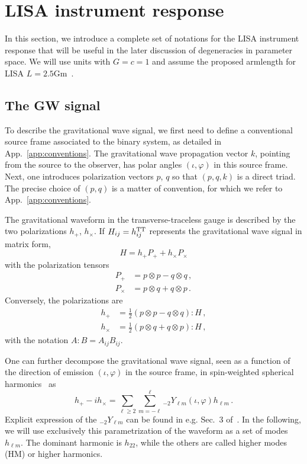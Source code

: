 \documentclass[aps,showpacs,twocolumn,prd,superscriptaddress,nofootinbib]{revtex4-1}
\newcommand{\be}{\begin{equation}}
\newcommand{\ee}{\end{equation}}
\newcommand{\bsub}{\begin{subequations}}
\newcommand{\esub}{\end{subequations}}
\begin{document}

\section{LISA instrument response}
\label{sec:response}

In this section, we introduce a complete set of notations for the LISA instrument response that will be useful in the later discussion of degeneracies in parameter space. We will use units with $G=c=1$ and assume the proposed armlength for LISA $L = 2.5\mathrm{Gm}$~\cite{LISA2017}.


\subsection{The GW signal}
\label{sec:gwsignal}

To describe the gravitational wave signal, we first need to define a conventional source frame associated to the binary system, as detailed in App.~\ref{app:conventions}. The gravitational wave propagation vector $k$, pointing from the source to the observer, has polar angles $(\iota, \varphi)$ in this source frame. Next, one introduces polarization vectors $p$, $q$ so that $(p, q, k)$ is a direct triad. The precise choice of $(p,q)$ is a matter of convention, for which we refer to App.~\ref{app:conventions}.

The gravitational waveform in the transverse-traceless gauge is described by the two polarizations $h_{+}$, $h_{\times}$. If $H_{ij} = h_{ij}^{\rm TT}$ represents the gravitational wave signal in matrix form,
\be
	H = h_{+} P_{+} + h_{\times} P_{\times}
\ee
with the polarization tensors
\bsub
\begin{align}
	P_{+} &= p \otimes p - q \otimes q \,,\\
	P_{\times} &= p \otimes q + q \otimes p \,.
\end{align}
\esub
Conversely, the polarizations are
\bsub
\begin{align}
	h_{+} &= \frac{1}{2} \left(p \otimes p - q \otimes q \right) : H \,,\\
	h_{\times} &= \frac{1}{2} \left( p \otimes q + q \otimes p \right) : H \,,
\end{align}
\esub
with the notation $A : B = A_{ij}B_{ij}$.

One can further decompose the gravitational wave signal, seen as a function of the direction of emission $(\iota, \varphi)$ in the source frame, in spin-weighted spherical harmonics~\cite{Goldberg+67} as
\be\label{eq:hpcmodes}
	h_{+} - i h_{\times} = \sum_{\ell \geq 2} \sum_{m = -\ell}^{\ell} {}_{-2}Y_{\ell m} (\iota, \varphi) h_{\ell m} \,.
\ee
Explicit expression of the ${}_{-2}Y_{\ell m}$ can be found in e.g. Sec.~3 of~\cite{BlanchetLiving}. In the following, we will use exclusively this parametrization of the waveform as a set of modes $h_{\ell m}$. The dominant harmonic is $h_{22}$, while the others are called higher modes (HM) or higher harmonics.
\end{document}
